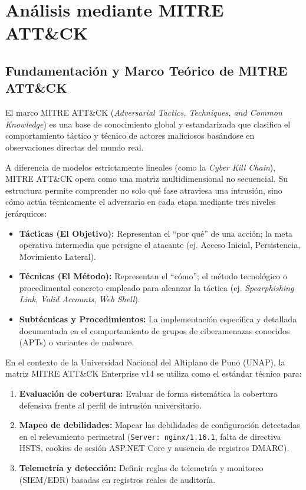 \chapter{Análisis mediante MITRE ATT\&CK}\label{ch:mitre_attack}

\section{Fundamentación y Marco Teórico de MITRE ATT\&CK}

El marco MITRE ATT\&CK (\textit{Adversarial Tactics, Techniques, and Common Knowledge}) es una base de conocimiento global y estandarizada que clasifica el comportamiento táctico y técnico de actores maliciosos basándose en observaciones directas del mundo real.

A diferencia de modelos estrictamente lineales (como la \textit{Cyber Kill Chain}), MITRE ATT\&CK opera como una matriz multidimensional no secuencial. Su estructura permite comprender no solo qué fase atraviesa una intrusión, sino cómo actúa técnicamente el adversario en cada etapa mediante tres niveles jerárquicos:

\begin{itemize}
    \item \textbf{Tácticas (El Objetivo):} Representan el ``por qué'' de una acción; la meta operativa intermedia que persigue el atacante (ej. Acceso Inicial, Persistencia, Movimiento Lateral).
    \item \textbf{Técnicas (El Método):} Representan el ``cómo''; el método tecnológico o procedimental concreto empleado para alcanzar la táctica (ej. \textit{Spearphishing Link}, \textit{Valid Accounts}, \textit{Web Shell}).
    \item \textbf{Subtécnicas y Procedimientos:} La implementación específica y detallada documentada en el comportamiento de grupos de ciberamenazas conocidos (APTs) o variantes de malware.
\end{itemize}

En el contexto de la Universidad Nacional del Altiplano de Puno (UNAP), la matriz MITRE ATT\&CK Enterprise v14 se utiliza como el estándar técnico para:

\begin{enumerate}
    \item \textbf{Evaluación de cobertura:} Evaluar de forma sistemática la cobertura defensiva frente al perfil de intrusión universitario.
    \item \textbf{Mapeo de debilidades:} Mapear las debilidades de configuración detectadas en el relevamiento perimetral (\texttt{Server: nginx/1.16.1}, falta de directiva HSTS, cookies de sesión ASP.NET Core y ausencia de registros DMARC).
    \item \textbf{Telemetría y detección:} Definir reglas de telemetría y monitoreo (SIEM/EDR) basadas en registros reales de auditoría.
\end{enumerate}

